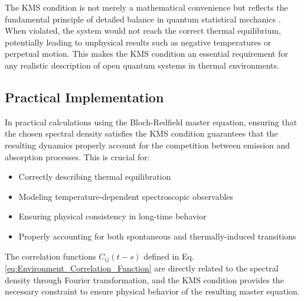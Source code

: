 \noindent The KMS condition is not merely a mathematical convenience but reflects the fundamental principle of detailed balance in quantum statistical mechanics \cite{AccardiEtAl2016ThreeNewPrinciples}. When violated, the system would not reach the correct thermal equilibrium, potentially leading to unphysical results such as negative temperatures or perpetual motion. This makes the KMS condition an essential requirement for any realistic description of open quantum systems in thermal environments.

\subsection{Practical Implementation}
\label{subsec:practical_implementation}

\noindent In practical calculations using the Bloch-Redfield master equation, ensuring that the chosen spectral density satisfies the KMS condition guarantees that the resulting dynamics properly account for the competition between emission and absorption processes. This is crucial for:

\begin{itemize}
    \item Correctly describing thermal equilibration
    \item Modeling temperature-dependent spectroscopic observables
    \item Ensuring physical consistency in long-time behavior
    \item Properly accounting for both spontaneous and thermally-induced transitions
\end{itemize}

\noindent The correlation functions $C_{ij}(t-s)$ defined in Eq. \eqref{eq:Environment_Correlation_Function} are directly related to the spectral density through Fourier transformation, and the KMS condition provides the necessary constraint to ensure physical behavior of the resulting master equation.